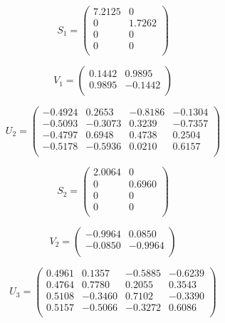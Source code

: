 \documentclass[11pt]{article}
\begin{document}
\begin{equation}
        \nonumber S_1 =
\begin{pmatrix}
    7.2125  &       0 \\
         0  &  1.7262 \\
         0  &       0 \\
         0  &       0 \\
\end{pmatrix}
\end{equation}

\begin{equation}
        \nonumber V_1 =
\begin{pmatrix}
    0.1442 &  0.9895 \\
    0.9895 &  -0.1442 \\
\end{pmatrix}
\end{equation}

\begin{equation}
        \nonumber U_2 =
\begin{pmatrix}
   -0.4924  &  0.2653  & -0.8186 &  -0.1304 \\
   -0.5093  & -0.3073  &  0.3239 &  -0.7357 \\
   -0.4797  &  0.6948  &  0.4738 &   0.2504 \\
   -0.5178  & -0.5936  &  0.0210 &   0.6157 \\
\end{pmatrix}
\end{equation}

\begin{equation}
        \nonumber S_2 =
\begin{pmatrix}
    2.0064  &       0 \\
         0  &  0.6960 \\
         0  &       0 \\
         0  &       0 \\
\end{pmatrix}
\end{equation}

\begin{equation}
        \nonumber V_2 =
\begin{pmatrix}
   -0.9964  &  0.0850 \\
   -0.0850  & -0.9964 \\
\end{pmatrix}
\end{equation}


\begin{equation}
        \nonumber U_3 =
\begin{pmatrix}
    0.4961  &  0.1357 &  -0.5885 &  -0.6239 \\
    0.4764  &  0.7780 &   0.2055 &   0.3543 \\
    0.5108  & -0.3460 &   0.7102  & -0.3390 \\
    0.5157  & -0.5066 &  -0.3272 &   0.6086 \\
\end{pmatrix}
\end{equation}
\end{document}

